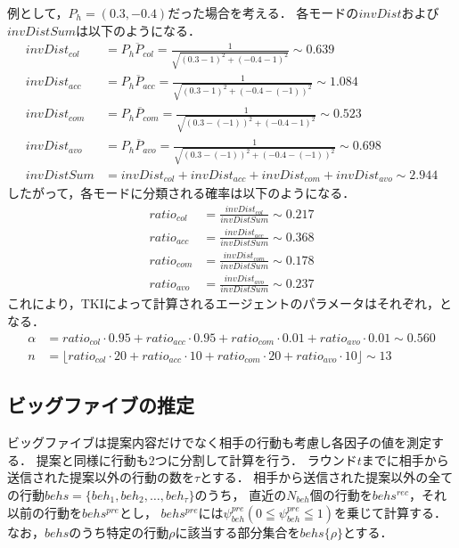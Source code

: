 例として，$P_h = (0.3, -0.4)$だった場合を考える．
各モードの$invDist$および$invDistSum$は以下のようになる．
\begin{align}
    invDist_{col} &= \overline{P_h P_{col}} = \frac{1}{\sqrt{(0.3 - 1)^2 + (-0.4 - 1)^2}} \sim 0.639 \nonumber\\
    invDist_{acc} &= \overline{P_h P_{acc}} = \frac{1}{\sqrt{(0.3 - 1)^2 + (-0.4 - (-1))^2}} \sim 1.084 \nonumber\\
    invDist_{com} &= \overline{P_h P_{com}} = \frac{1}{\sqrt{(0.3 - (-1))^2 + (-0.4 - 1)^2}} \sim 0.523 \nonumber\\
    invDist_{avo} &= \overline{P_h P_{avo}} = \frac{1}{\sqrt{(0.3 - (-1))^2 + (-0.4 - (-1))^2}} \sim 0.698 \nonumber\\
    invDistSum &= invDist_{col} + invDist_{acc} + invDist_{com} + invDist_{avo} \sim 2.944 \nonumber
\end{align}
したがって，各モードに分類される確率は以下のようになる．
\begin{align}
    ratio_{col} &= \frac{invDist_{col}}{invDistSum} \sim 0.217 \nonumber\\
    ratio_{acc} &= \frac{invDist_{acc}}{invDistSum} \sim 0.368 \nonumber\\
    ratio_{com} &= \frac{invDist_{com}}{invDistSum} \sim 0.178 \nonumber\\
    ratio_{avo} &= \frac{invDist_{avo}}{invDistSum} \sim 0.237 \nonumber
\end{align}
これにより，TKIによって計算されるエージェントのパラメータはそれぞれ，となる．
\begin{align}
    \alpha &= ratio_{col} \cdot 0.95 + ratio_{acc} \cdot 0.95 + ratio_{com} \cdot 0.01 + ratio_{avo} \cdot 0.01 \sim 0.560 \label{eq:tki-alpha} \\
    n &= \lfloor ratio_{col} \cdot 20 + ratio_{acc} \cdot 10 + ratio_{com} \cdot 20 + ratio_{avo} \cdot 10 \rfloor \sim 13 \label{eq:tki-n}
\end{align}

\subsection{ビッグファイブの推定}
ビッグファイブは提案内容だけでなく相手の行動も考慮し各因子の値を測定する．
提案と同様に行動も2つに分割して計算を行う．
ラウンド$t$までに相手から送信された提案以外の行動の数を$\tau$とする．
相手から送信された提案以外の全ての行動$behs = \{ beh_1, beh_2, \ldots , beh_\tau \}$のうち，
直近の$N_{beh}$個の行動を$behs^{rec}$，それ以前の行動を$behs^{pre}$とし，
$behs^{pre}$には$\psi_{beh}^{pre}(0 \leqq \psi_{beh}^{pre} \leqq 1)$を乗じて計算する．
なお，$behs$のうち特定の行動$\rho$に該当する部分集合を$behs\{\rho\}$とする．

